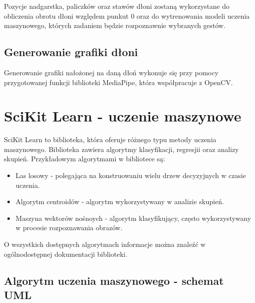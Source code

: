     \quad Pozycje nadgarstka, paliczków oraz stawów dłoni zostaną wykorzystane do obliczenia obrotu dłoni względem punkut 0 oraz do wytrenowania modeli uczenia maszynowego, których zadaniem będzie rozpoznawnie wybranych gestów. 
    
    \subsection{Generowanie grafiki dłoni}
    
    \quad Generowanie grafiki nałożonej na daną dłoń wykonuje się przy pomocy przygotowanej funkcji biblioteki MediaPipe, która współpracuje z OpenCV.   
    
    
    
    \section{SciKit Learn - uczenie maszynowe}
    
    \quad SciKit Learn to biblioteka, która oferuje różnego typu metody uczenia maszynowego. Biblioteka zawiera algorytmy klasyfikacji, regresjii oraz analizy skupień. Przykładowym algorytmami w bibliotece są:
    
    \begin{itemize}
        \item Las losowy - polegająca na konstruowaniu wielu drzew decyzyjnych w czasie uczenia. 
        \item Algorytm centroidów - algorytm wykorzystywany w analizie skupień.
        \item Maszyna wektorów nośnoych - algorytm klasyfikujący, często wykorzystywany w procesie rozpoznawania obrazów. 
    \end{itemize}
    
    O wszystkich dostępnych algorytmach informacje można znaleźć w ogólnodostępnej dokumentacji biblioteki. 
    
    \subsection{Algorytm uczenia maszynowego - schemat UML}


